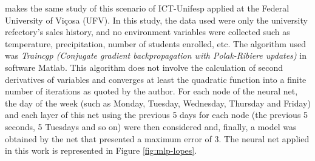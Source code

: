          makes the same study of this scenario of ICT-Unifesp applied at the Federal University of Viçosa (UFV). In this study, the data used were only the university refectory's sales history, and no environment variables were collected such as temperature, precipitation, number of students enrolled, etc. The algorithm used was \textit{Traincgp (Conjugate gradient backpropagation with Polak-Ribiere updates)} in software Matlab. This algorithm does not involve the calculation of second derivatives of variables and converges at least the quadratic function into a finite number of iterations as quoted by the author. For each node of the neural net, the day of the week (such as Monday, Tuesday, Wednesday, Thursday and Friday) and each layer of this net using the previous 5 days for each node (the previous 5 seconds, 5 Tuesdays and so on) were then considered and, finally, a model was obtained by the net that presented a maximum error of 3. The neural net applied in this work is represented in Figure \ref{fig:mlp-lopes}.
        
        \begin{figure}[h]
        \end{figure}
        
